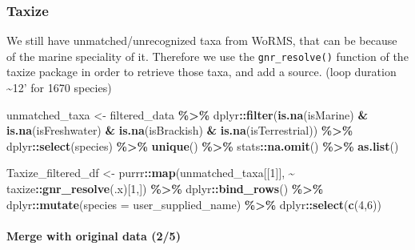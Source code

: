 \documentclass[
]{article}
\newenvironment{Shaded}{\begin{snugshade}}{\end{snugshade}}
\newcommand{\AttributeTok}[1]{\textcolor[rgb]{0.13,0.29,0.53}{#1}}
\newcommand{\DecValTok}[1]{\textcolor[rgb]{0.00,0.00,0.81}{#1}}
\newcommand{\FunctionTok}[1]{\textcolor[rgb]{0.13,0.29,0.53}{\textbf{#1}}}
\newcommand{\NormalTok}[1]{#1}
\newcommand{\OtherTok}[1]{\textcolor[rgb]{0.56,0.35,0.01}{#1}}
\newcommand{\SpecialCharTok}[1]{\textcolor[rgb]{0.81,0.36,0.00}{\textbf{#1}}}
\begin{document}
\hypertarget{taxize}{%
\subsubsection{Taxize}\label{taxize}}

We still have unmatched/unrecognized taxa from WoRMS, that can be
because of the marine speciality of it. Therefore we use the
\texttt{gnr\_resolve()} function of the taxize package in order to
retrieve those taxa, and add a source. (loop duration \textasciitilde12'
for 1670 species)

\begin{Shaded}
\begin{Highlighting}[]
\NormalTok{unmatched\_taxa }\OtherTok{\textless{}{-}}\NormalTok{ filtered\_data }\SpecialCharTok{\%\textgreater{}\%}
\NormalTok{  dplyr}\SpecialCharTok{::}\FunctionTok{filter}\NormalTok{(}\FunctionTok{is.na}\NormalTok{(isMarine) }\SpecialCharTok{\&} \FunctionTok{is.na}\NormalTok{(isFreshwater) }\SpecialCharTok{\&} \FunctionTok{is.na}\NormalTok{(isBrackish) }\SpecialCharTok{\&} \FunctionTok{is.na}\NormalTok{(isTerrestrial)) }\SpecialCharTok{\%\textgreater{}\%}
\NormalTok{  dplyr}\SpecialCharTok{::}\FunctionTok{select}\NormalTok{(species) }\SpecialCharTok{\%\textgreater{}\%}
  \FunctionTok{unique}\NormalTok{() }\SpecialCharTok{\%\textgreater{}\%}
\NormalTok{  stats}\SpecialCharTok{::}\FunctionTok{na.omit}\NormalTok{() }\SpecialCharTok{\%\textgreater{}\%}
  \FunctionTok{as.list}\NormalTok{()}

\NormalTok{Taxize\_filtered\_df }\OtherTok{\textless{}{-}}\NormalTok{ purrr}\SpecialCharTok{::}\FunctionTok{map}\NormalTok{(unmatched\_taxa[[}\DecValTok{1}\NormalTok{]], }\SpecialCharTok{\textasciitilde{}}\NormalTok{ taxize}\SpecialCharTok{::}\FunctionTok{gnr\_resolve}\NormalTok{(.x)[}\DecValTok{1}\NormalTok{,]) }\SpecialCharTok{\%\textgreater{}\%}
\NormalTok{  dplyr}\SpecialCharTok{::}\FunctionTok{bind\_rows}\NormalTok{() }\SpecialCharTok{\%\textgreater{}\%}
\NormalTok{  dplyr}\SpecialCharTok{::}\FunctionTok{mutate}\NormalTok{(}\AttributeTok{species =}\NormalTok{ user\_supplied\_name) }\SpecialCharTok{\%\textgreater{}\%}
\NormalTok{  dplyr}\SpecialCharTok{::}\FunctionTok{select}\NormalTok{(}\FunctionTok{c}\NormalTok{(}\DecValTok{4}\NormalTok{,}\DecValTok{6}\NormalTok{))}
\end{Highlighting}
\end{Shaded}

\hypertarget{merge-with-original-data-25}{%
\paragraph{Merge with original data
(2/5)}\label{merge-with-original-data-25}}
\end{document}
